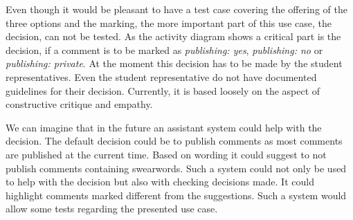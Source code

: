 Even though it would be pleasant to have a test case covering the offering of the three options and the marking, the more important part of this use case, the decision, can not be tested.
As the activity diagram shows a critical part is the decision, if a comment is to be marked as \emph{publishing: yes}, \emph{publishing: no} or \emph{publishing: private}.
At the moment this decision has to be made by the student representatives.
Even the student representative do not have documented guidelines for their decision.
Currently, it is based loosely on the aspect of constructive critique and empathy.

We can imagine that in the future an assistant system could help with the decision.
The default decision could be to publish comments as most comments are published at the current time.
Based on wording it could suggest to not publish comments containing swearwords.
Such a system could not only be used to help with the decision but also with checking decisions made.
It could highlight comments marked different from the suggestions.
Such a system would allow some tests regarding the presented use case.
